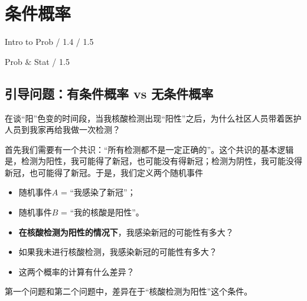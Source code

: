 \chapter{条件概率}
\begin{introduction}
  \item Intro to Prob / 1.4 / 1.5 
  \item Prob $\&$ Stat / 1.5
\end{introduction}

\section{引导问题：有条件概率 vs 无条件概率}
\begin{instance}
    在谈“阳”色变的时间段，当我核酸检测出现“阳性”之后，为什么社区人员带着医护人员到我家再给我做一次检测？

首先我们需要有一个共识：“所有检测都不是一定正确的”。这个共识的基本逻辑是，检测为阳性，我可能得了新冠，也可能没有得新冠；检测为阴性，我可能没得新冠，也可能得了新冠。于是，我们定义两个随机事件
\begin{itemize}
\item 随机事件$A$ = “我感染了新冠”；
\item 随机事件$B$ = “我的核酸是阳性”。
\end{itemize}
\begin{problem}
  \begin{itemize}
    \item {\bf 在核酸检测为阳性的情况下}，我感染新冠的可能性有多大？
    \item 如果我未进行核酸检测，我感染新冠的可能性有多大？
    \item 这两个概率的计算有什么差异？
\end{itemize}  
\end{problem}
\begin{remark}
    第一个问题和第二个问题中，差异在于“核酸检测为阳性”这个条件。
\end{remark}
\end{instance}



